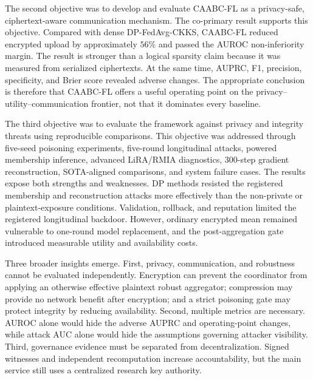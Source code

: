 The second objective was to develop and evaluate CAABC-FL as a privacy-safe, ciphertext-aware communication mechanism. The co-primary result supports this objective. Compared with dense DP-FedAvg-CKKS, CAABC-FL reduced encrypted upload by approximately $56\%$ and passed the AUROC non-inferiority margin. The result is stronger than a logical sparsity claim because it was measured from serialized ciphertexts. At the same time, AUPRC, F1, precision, specificity, and Brier score revealed adverse changes. The appropriate conclusion is therefore that CAABC-FL offers a useful operating point on the privacy--utility--communication frontier, not that it dominates every baseline.

The third objective was to evaluate the framework against privacy and integrity threats using reproducible comparisons. This objective was addressed through five-seed poisoning experiments, five-round longitudinal attacks, powered membership inference, advanced LiRA/RMIA diagnostics, 300-step gradient reconstruction, SOTA-aligned comparisons, and system failure cases. The results expose both strengths and weaknesses. DP methods resisted the registered membership and reconstruction attacks more effectively than the non-private or plaintext-exposure conditions. Validation, rollback, and reputation limited the registered longitudinal backdoor. However, ordinary encrypted mean remained vulnerable to one-round model replacement, and the post-aggregation gate introduced measurable utility and availability costs.

Three broader insights emerge. First, privacy, communication, and robustness cannot be evaluated independently. Encryption can prevent the coordinator from applying an otherwise effective plaintext robust aggregator; compression may provide no network benefit after encryption; and a strict poisoning gate may protect integrity by reducing availability. Second, multiple metrics are necessary. AUROC alone would hide the adverse AUPRC and operating-point changes, while attack AUC alone would hide the assumptions governing attacker visibility. Third, governance evidence must be separated from decentralization. Signed witnesses and independent recomputation increase accountability, but the main service still uses a centralized research key authority.

